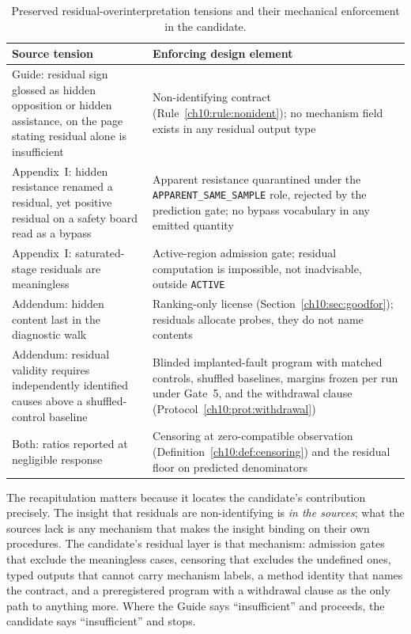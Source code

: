\begin{table}[htbp]
\centering
\small
\begin{tabular}{@{}p{}p{}@{}}
\toprule
Source tension & Enforcing design element \\
\midrule
Guide: residual sign glossed as hidden opposition or hidden
assistance, on the page stating residual alone is insufficient &
Non-identifying contract (Rule~\ref{ch10:rule:nonident}); no mechanism
field exists in any residual output type \\
\addlinespace
Appendix~I: hidden resistance renamed a residual, yet positive
residual on a safety board read as a bypass &
Apparent resistance quarantined under the
\texttt{APPARENT\_SAME\_SAMPLE} role, rejected by the prediction gate;
no bypass vocabulary in any emitted quantity \\
\addlinespace
Appendix~I: saturated-stage residuals are meaningless &
Active-region admission gate; residual computation is impossible, not
inadvisable, outside \texttt{ACTIVE} \\
\addlinespace
Addendum: hidden content last in the diagnostic walk &
Ranking-only license (Section~\ref{ch10:sec:goodfor}); residuals
allocate probes, they do not name contents \\
\addlinespace
Addendum: residual validity requires independently identified causes
above a shuffled-control baseline &
Blinded implanted-fault program with matched controls, shuffled
baselines, margins frozen per run under Gate~5, and the withdrawal clause
(Protocol~\ref{ch10:prot:withdrawal}) \\
\addlinespace
Both: ratios reported at negligible response &
Censoring at zero-compatible observation
(Definition~\ref{ch10:def:censoring}) and the residual floor on
predicted denominators \\
\bottomrule
\end{tabular}
\caption{Preserved residual-overinterpretation tensions and their
mechanical enforcement in the candidate.}
\label{ch10:tab:tensions}
\end{table}

The recapitulation matters because it locates the candidate's
contribution precisely. The insight that residuals are non-identifying
is \emph{in the sources}; what the sources lack is any mechanism that
makes the insight binding on their own procedures. The candidate's
residual layer is that mechanism: admission gates that exclude the
meaningless cases, censoring that excludes the undefined ones, typed
outputs that cannot carry mechanism labels, a method identity that
names the contract, and a preregistered program with a withdrawal
clause as the only path to anything more. Where the Guide says
``insufficient'' and proceeds, the candidate says ``insufficient'' and
stops.

